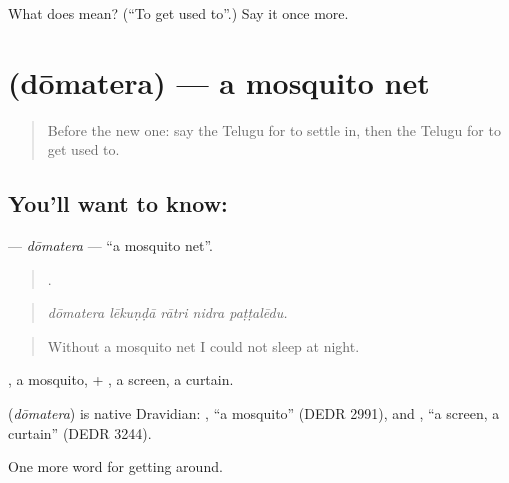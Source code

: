 \begin{tcolorbox}[breakable,colback=teal!4,colframe=teal!35!black,title={Before you move on}]
What does  mean? (\textquotedblleft{}To get used to\textquotedblright{}.) Say it once more.
\end{tcolorbox}
\section[\texorpdfstring{\te{దోమతెర} (dōmatera)}{దోమతెర (dōmatera)}]{ (dōmatera) — a mosquito net}

\label{lesson:TE-C458-domatera}



\begin{quote}
Before the new one: say the Telugu for to settle in, then the Telugu for to get used to.
\end{quote}

\subsection*{You'll want to know: }
\textbf{} — \emph{dōmatera} — \textquotedblleft{}a mosquito net\textquotedblright{}.

\begin{quote}
    .
\end{quote}

\begin{quote}
\emph{dōmatera lēkuṇḍā rātri nidra paṭṭalēdu.}
\end{quote}

\begin{quote}
Without a mosquito net I could not sleep at night.
\end{quote}

, a mosquito, + , a screen, a curtain.

\begin{cousinweb}
\textbf{} (\emph{dōmatera}) is native Dravidian: , \textquotedblleft{}a mosquito\textquotedblright{} (DEDR 2991), and , \textquotedblleft{}a screen, a curtain\textquotedblright{} (DEDR 3244).
\end{cousinweb}

\begin{grammarlens}[title={What you've built}]
One more word for getting around.
\end{grammarlens}

